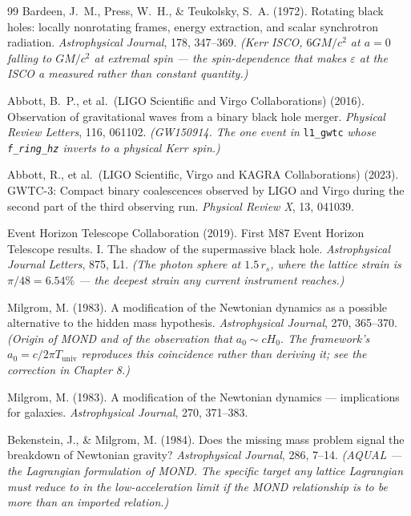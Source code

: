 \documentclass[11pt, letterpaper, openany]{book}
\begin{document}
\begin{thebibliography}{99}
Bardeen, J.~M., Press, W.~H., \& Teukolsky, S.~A. (1972).
Rotating black holes: locally nonrotating frames, energy extraction, and scalar synchrotron
radiation.
\textit{Astrophysical Journal}, 178, 347--369.
\textit{(Kerr ISCO, $6GM/c^2$ at $a=0$ falling to $GM/c^2$ at extremal spin --- the
spin-dependence that makes $\varepsilon$ at the ISCO a measured rather than constant quantity.)}

Abbott, B.~P., et al.\ (LIGO Scientific and Virgo Collaborations) (2016).
Observation of gravitational waves from a binary black hole merger.
\textit{Physical Review Letters}, 116, 061102.
\textit{(GW150914. The one event in} \texttt{l1\_gwtc} \textit{whose
\texttt{f\_ring\_hz} inverts to a physical Kerr spin.)}

Abbott, R., et al.\ (LIGO Scientific, Virgo and KAGRA Collaborations) (2023).
GWTC-3: Compact binary coalescences observed by LIGO and Virgo during the second part of the
third observing run.
\textit{Physical Review X}, 13, 041039.

Event Horizon Telescope Collaboration (2019).
First M87 Event Horizon Telescope results. I. The shadow of the supermassive black hole.
\textit{Astrophysical Journal Letters}, 875, L1.
\textit{(The photon sphere at $1.5\,r_s$, where the lattice strain is $\pi/48 = 6.54\%$ ---
the deepest strain any current instrument reaches.)}


Milgrom, M. (1983).
A modification of the Newtonian dynamics as a possible alternative to the hidden mass
hypothesis.
\textit{Astrophysical Journal}, 270, 365--370.
\textit{(Origin of MOND and of the observation that $a_0 \sim cH_0$. The framework's
$a_0 = c/2\pi T_{\mathrm{univ}}$ reproduces this coincidence rather than deriving it; see the
correction in Chapter 8.)}

Milgrom, M. (1983).
A modification of the Newtonian dynamics --- implications for galaxies.
\textit{Astrophysical Journal}, 270, 371--383.

Bekenstein, J., \& Milgrom, M. (1984).
Does the missing mass problem signal the breakdown of Newtonian gravity?
\textit{Astrophysical Journal}, 286, 7--14.
\textit{(AQUAL --- the Lagrangian formulation of MOND. The specific target any lattice
Lagrangian must reduce to in the low-acceleration limit if the MOND relationship is to be more
than an imported relation.)}


\end{thebibliography}
\end{document}
